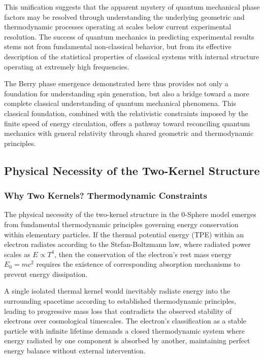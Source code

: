 \documentclass[%
 reprint,
 amsmath,amssymb,
 aps,
]{revtex4-1}
\numberwithin{equation}{section}%
\begin{document}
This unification suggests that the apparent mystery of quantum mechanical phase factors may be resolved through understanding the underlying geometric and thermodynamic processes operating at scales below current experimental resolution. The success of quantum mechanics in predicting experimental results stems not from fundamental non-classical behavior, but from its effective description of the statistical properties of classical systems with internal structure operating at extremely high frequencies.

The Berry phase emergence demonstrated here thus provides not only a foundation for understanding spin generation, but also a bridge toward a more complete classical understanding of quantum mechanical phenomena. This classical foundation, combined with the relativistic constraints imposed by the finite speed of energy circulation, offers a pathway toward reconciling quantum mechanics with general relativity through shared geometric and thermodynamic principles.


\subsection{Physical Necessity of the Two-Kernel Structure} \label{subsec:two_kernel_necessity}

\subsubsection{Why Two Kernels? Thermodynamic Constraints} \label{subsec:why_two_kernels}

The physical necessity of the two-kernel structure in the 0-Sphere model emerges from fundamental thermodynamic principles governing energy conservation within elementary particles. If the thermal potential energy (TPE) within an electron radiates according to the Stefan-Boltzmann law, where radiated power scales as $E \propto T^4$, then the conservation of the electron's rest mass energy $E_0 = mc^2$ requires the existence of corresponding absorption mechanisms to prevent energy dissipation.

A single isolated thermal kernel would inevitably radiate energy into the surrounding spacetime according to established thermodynamic principles, leading to progressive mass loss that contradicts the observed stability of electrons over cosmological timescales. The electron's classification as a stable particle with infinite lifetime demands a closed thermodynamic system where energy radiated by one component is absorbed by another, maintaining perfect energy balance without external intervention.
\end{document}
